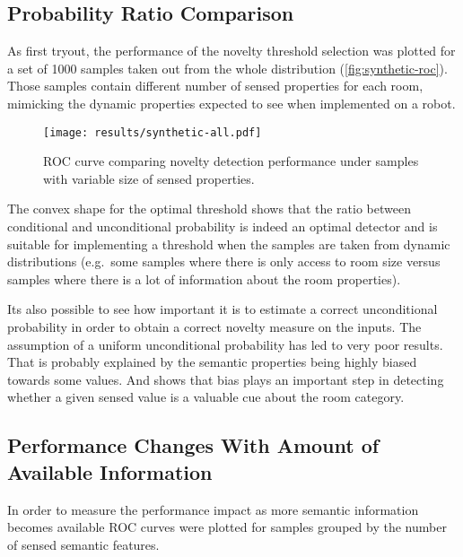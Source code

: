 \subsection{Probability Ratio Comparison}
As first tryout, the performance of the novelty threshold selection was plotted for a set
of 1000 samples taken out from the whole distribution (\autoref{fig:synthetic-roc}).
Those samples contain different number of sensed properties for each room, mimicking
the dynamic properties expected to see when implemented on a robot.

\begin{figure}[h]
\centering
\texttt{[image: results/synthetic-all.pdf]}

\caption{\label{fig:synthetic-roc}ROC curve comparing novelty detection performance
         under samples with variable size of sensed properties.}
\end{figure}

The convex shape for the optimal threshold shows that the ratio between conditional
and unconditional probability is indeed an optimal detector and is suitable for
implementing a threshold when the samples are taken from dynamic
distributions (e.g.\ some samples where there is only access to room size versus
samples where there is a lot of information about the room properties).

Its also possible to see how important it is to estimate a correct unconditional
probability in order to obtain a correct novelty measure on the inputs.
The assumption of a uniform unconditional probability has led to very poor results.
That is probably explained by the semantic properties being highly
biased towards some values. And shows that bias plays an important step
in detecting whether a given sensed value is a valuable cue about the room category.



\subsection{Performance Changes With Amount of Available Information}
In order to measure the performance impact as more semantic information becomes
available ROC curves were plotted for samples grouped by the number of sensed
semantic features.

